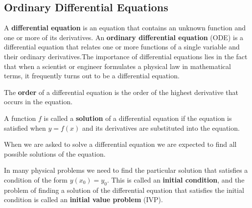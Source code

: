 \subsection{Ordinary Differential Equations}

A \textbf{differential equation }is an equation that contains an unknown
function and one or more of its derivatives.
An \textbf{ordinary differential equation} (ODE) is a differential equation
that relates one or more functions of a single variable and their ordinary
derivatives.The importance of differential equations lies in the fact that
when a scientist or engineer formulates a physical law in mathematical terms,
it frequently turns out to be a differential equation.

The \textbf{order} of a differential equation is the order of the highest
derivative that occurs in the equation.

A function \(f\) is called a \textbf{solution} of a differential equation if
the equation is satisfied when \(y=f(x)\) and its derivatives are substituted
into the equation.

When we are asked to solve a differential equation we are expected to find all
possible solutions of the equation.

In many physical problems we need to find the particular solution that
satisfies a condition of the form \(y(x_0)=y_0\).
This is called an \textbf{initial condition}, and the problem of finding a
solution of the differential equation that satisfies the initial condition is
called an \textbf{initial value problem} (IVP).

